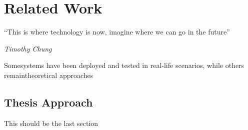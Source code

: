 \chapter{Related Work} %
\label{chap:Chapter3}       %
\epigraph{``This is where technology is now, imagine where we can go in the future” }{\textit{Timothy Chung}}

Somesystems have been deployed and tested in real-life scenarios, while others remaintheoretical approaches
\section{Thesis Approach}
This should be the last section
